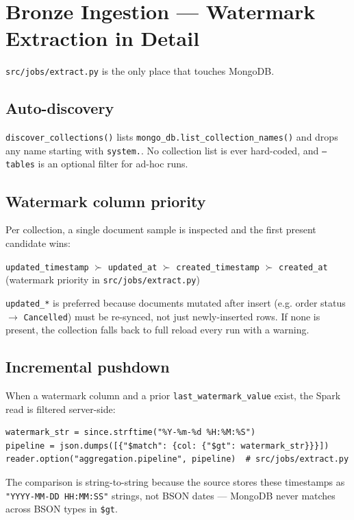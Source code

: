 \documentclass[11pt,a4paper]{article}
\begin{document}
\section{Bronze Ingestion — Watermark Extraction in Detail}

\texttt{src/jobs/extract.py} is the only place that touches MongoDB.

\subsection{Auto-discovery}
\texttt{discover\_collections()} lists \texttt{mongo\_db.list\_collection\_names()} and drops any name starting with \texttt{system.}. No collection list is ever hard-coded, and \texttt{--tables} is an optional filter for ad-hoc runs.

\subsection{Watermark column priority}
Per collection, a single document sample is inspected and the first present candidate wins:
\begin{center}
\texttt{updated\_timestamp} $\succ$ \texttt{updated\_at} $\succ$ \texttt{created\_timestamp} $\succ$ \texttt{created\_at} \quad (watermark priority in \texttt{src/jobs/extract.py})
\end{center}
\texttt{updated\_*} is preferred because documents mutated after insert (e.g. order status $\rightarrow$ \texttt{Cancelled}) must be re-synced, not just newly-inserted rows. If none is present, the collection falls back to full reload every run with a warning.

\subsection{Incremental pushdown}
When a watermark column and a prior \texttt{last\_watermark\_value} exist, the Spark read is filtered server-side:
\begin{lstlisting}[style=py,caption={Pushdown filter — string comparison is intentional}]
watermark_str = since.strftime("%Y-%m-%d %H:%M:%S")
pipeline = json.dumps([{"$match": {col: {"$gt": watermark_str}}}])
reader.option("aggregation.pipeline", pipeline)  # src/jobs/extract.py
\end{lstlisting}
The comparison is string-to-string because the source stores these timestamps as \texttt{"YYYY-MM-DD HH:MM:SS"} strings, not BSON dates — MongoDB never matches across BSON types in \texttt{\$gt}.
\end{document}
